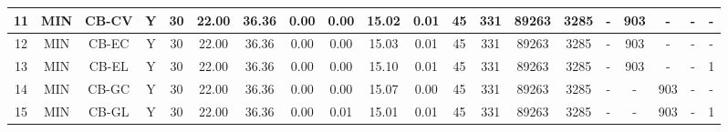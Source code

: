 {\begin{tabular}{ *{19}{c|} c }
\hline
11 & MIN & CB-CV & Y & 30 & 22.00 & 36.36 & 0.00 & 0.00 & 15.02 & 0.01 & 45 & 331 & 89263 & 3285 & - & 903 & - & - & -\\
\hline
12 & MIN & CB-EC & Y & 30 & 22.00 & 36.36 & 0.00 & 0.00 & 15.03 & 0.01 & 45 & 331 & 89263 & 3285 & - & 903 & - & - & -\\
\hline
13 & MIN & CB-EL & Y & 30 & 22.00 & 36.36 & 0.00 & 0.00 & 15.10 & 0.01 & 45 & 331 & 89263 & 3285 & - & 903 & - & - & 1\\
\hline
14 & MIN & CB-GC & Y & 30 & 22.00 & 36.36 & 0.00 & 0.00 & 15.07 & 0.00 & 45 & 331 & 89263 & 3285 & - & - & 903 & - & -\\
\hline
15 & MIN & CB-GL & Y & 30 & 22.00 & 36.36 & 0.00 & 0.01 & 15.01 & 0.01 & 45 & 331 & 89263 & 3285 & - & - & 903 & - & 1\\
\hline
\end{tabular}\\
\vspace{4mm}
}

